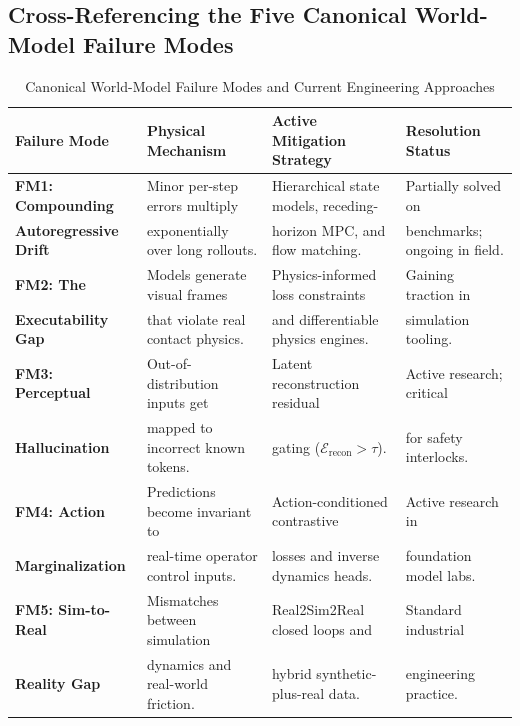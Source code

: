 \documentclass[11pt,a4paper]{article}
\begin{document}
\subsection{Cross-Referencing the Five Canonical World-Model Failure Modes}
\begin{table}[h!]
\centering
\small
\begin{tabularx}{\textwidth}{@{}l p{4.2cm} p{4.5cm} X@{}}
\toprule
\textbf{Failure Mode} & \textbf{Physical Mechanism} & \textbf{Active Mitigation Strategy} & \textbf{Resolution Status} \\
\midrule
\textbf{FM1: Compounding} & Minor per-step errors multiply & Hierarchical state models, receding- & Partially solved on \\
\textbf{Autoregressive Drift} & exponentially over long rollouts. & horizon MPC, and flow matching. & benchmarks; ongoing in field. \\
\addlinespace
\textbf{FM2: The} & Models generate visual frames & Physics-informed loss constraints & Gaining traction in \\
\textbf{Executability Gap} & that violate real contact physics. & and differentiable physics engines. & simulation tooling. \\
\addlinespace
\textbf{FM3: Perceptual} & Out-of-distribution inputs get & Latent reconstruction residual & Active research; critical \\
\textbf{Hallucination} & mapped to incorrect known tokens. & gating ($\mathcal{E}_{\text{recon}} > \tau$). & for safety interlocks. \\
\addlinespace
\textbf{FM4: Action} & Predictions become invariant to & Action-conditioned contrastive & Active research in \\
\textbf{Marginalization} & real-time operator control inputs. & losses and inverse dynamics heads. & foundation model labs. \\
\addlinespace
\textbf{FM5: Sim-to-Real} & Mismatches between simulation & Real2Sim2Real closed loops and & Standard industrial \\
\textbf{Reality Gap} & dynamics and real-world friction. & hybrid synthetic-plus-real data. & engineering practice. \\
\bottomrule
\end{tabularx}
\caption{Canonical World-Model Failure Modes and Current Engineering Approaches}
\end{table}
\end{document}
